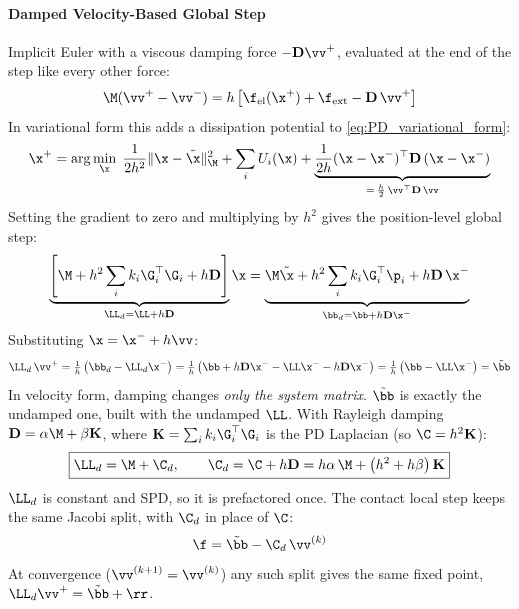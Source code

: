 
\begin{derivation}
\paragraph{Damped Velocity-Based Global Step}\mbox{}\par\medskip

\noindent Implicit Euler with a viscous damping force $-\mathbf{D}\vv^+$, evaluated at the end of the step like every other force:
\begin{equation*}
    \M(\vv^+ - \vv^-) = h\left[\f_{\text{el}}(\x^+) + \f_{\text{ext}} - \mathbf{D}\,\vv^+\right]
\end{equation*}
In variational form this adds a dissipation potential to \eqref{eq:PD_variational_form}:
\begin{equation*}
    \x^+ = \arg\min_\x\;
    \frac{1}{2h^2}\|\x - \tilde\x\|^2_\M
    + \sum_i U_i(\x)
    + \underbrace{\frac{1}{2h}(\x - \x^-)^\top\mathbf{D}\,(\x - \x^-)}_{=\,\frac h2\,\vv^\top\mathbf{D}\,\vv}
\end{equation*}
Setting the gradient to zero and multiplying by $h^2$ gives the position-level global step:
\begin{equation*}
    \underbrace{\left[\M + h^2\sum_i k_i\G_i^\top\G_i + h\mathbf{D}\right]}_{\LL_d = \LL + h\mathbf{D}}\x
    =
    \underbrace{\M\tilde\x + h^2\sum_i k_i\G_i^\top\p_i + h\mathbf{D}\,\x^-}_{\bb_d = \bb + h\mathbf{D}\x^-}
\end{equation*}
Substituting $\x = \x^- + h\vv$:
\begin{equation*}
    \LL_d\,\vv^+
    = \tfrac1h\left(\bb_d - \LL_d\x^-\right)
    = \tfrac1h\left(\bb + h\mathbf{D}\x^- - \LL\x^- - h\mathbf{D}\x^-\right)
    = \tfrac1h\left(\bb - \LL\x^-\right)
    = \tilde\bb
\end{equation*}
In velocity form, damping changes \emph{only the system matrix}. $\tilde\bb$ is exactly the undamped one, built with the undamped $\LL$.
\newline With Rayleigh damping $\mathbf{D} = \alpha\M + \beta\mathbf{K}$, where $\mathbf{K} = \sum_i k_i\G_i^\top\G_i$ is the PD Laplacian (so $\C = h^2\mathbf{K}$):
\begin{equation}
    \boxed{
    \LL_d = \M + \C_d,
    \qquad
    \C_d = \C + h\mathbf{D} = h\alpha\,\M + \left(h^2 + h\beta\right)\mathbf{K}
    }
\end{equation}
$\LL_d$ is constant and SPD, so it is prefactored once. The contact local step keeps the same Jacobi split, with $\C_d$ in place of $\C$:
\begin{equation*}
    \f = \tilde\bb - \C_d\,\vv^{(k)}
\end{equation*}
At convergence ($\vv^{(k+1)} = \vv^{(k)}$) any such split gives the same fixed point, $\LL_d\vv^+ = \tilde\bb + \rr$.
\end{derivation}

